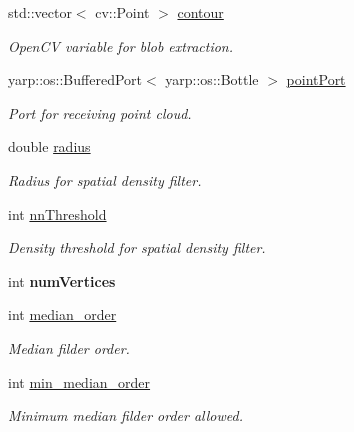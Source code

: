 \begin{DoxyCompactItemize}
std\+::vector$<$ cv\+::\+Point $>$ \mbox{\hyperlink{classSuperqComputation_ab35ce370798ac4744994185539b25a54}{contour}}
\begin{DoxyCompactList}\small\item\em Open\+CV variable for blob extraction. \end{DoxyCompactList}\item 
\mbox{\label{classSuperqComputation_aa8eaa06377f2a937eaafa6a21af2a2d4}} 
yarp\+::os\+::\+Buffered\+Port$<$ yarp\+::os\+::\+Bottle $>$ \mbox{\hyperlink{classSuperqComputation_aa8eaa06377f2a937eaafa6a21af2a2d4}{point\+Port}}
\begin{DoxyCompactList}\small\item\em Port for receiving point cloud. \end{DoxyCompactList}\item 
\mbox{\label{classSuperqComputation_a7c01fd3e1036076ddd945195be99ab2f}} 
double \mbox{\hyperlink{classSuperqComputation_a7c01fd3e1036076ddd945195be99ab2f}{radius}}
\begin{DoxyCompactList}\small\item\em Radius for spatial density filter. \end{DoxyCompactList}\item 
\mbox{\label{classSuperqComputation_a184368bb5e30b99c9286a47530a67995}} 
int \mbox{\hyperlink{classSuperqComputation_a184368bb5e30b99c9286a47530a67995}{nn\+Threshold}}
\begin{DoxyCompactList}\small\item\em Density threshold for spatial density filter. \end{DoxyCompactList}\item 
\mbox{\label{classSuperqComputation_a6d42c789127b151b2b57cf700b18b25e}} 
int {\bfseries num\+Vertices}
\item 
\mbox{\label{classSuperqComputation_a89c7e41d61c5d05cdecc2f9db26d7820}} 
int \mbox{\hyperlink{classSuperqComputation_a89c7e41d61c5d05cdecc2f9db26d7820}{median\+\_\+order}}
\begin{DoxyCompactList}\small\item\em Median filder order. \end{DoxyCompactList}\item 
\mbox{\label{classSuperqComputation_a5672798eb1d57d4b5001cde356e6d9f2}} 
int \mbox{\hyperlink{classSuperqComputation_a5672798eb1d57d4b5001cde356e6d9f2}{min\+\_\+median\+\_\+order}}
\begin{DoxyCompactList}\small\item\em Minimum median filder order allowed. \end{DoxyCompactList}\item 

\end{DoxyCompactItemize}
